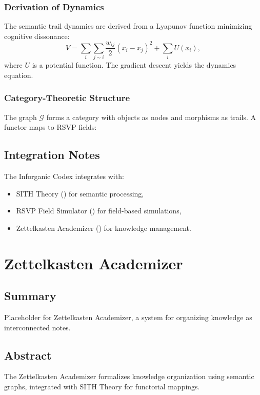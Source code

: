 \documentclass[11pt,oneside]{memoir}
\theoremstyle{plain}
\newcommand{\F}{\mathcal{F}}
\begin{document}
\subsection{Derivation of Dynamics}
The semantic trail dynamics are derived from a Lyapunov function minimizing cognitive dissonance:
\begin{equation}
    V = \sum_i \sum_{j \sim i} \frac{w_{ij}}{2} (x_i - x_j)^2 + \sum_i U(x_i),
\end{equation}
where \(U\) is a potential function. The gradient descent yields the dynamics equation.

\subsection{Category-Theoretic Structure}
The graph \(\mathcal{G}\) forms a category with objects as nodes and morphisms as trails. A functor maps to RSVP fields:

\section{Integration Notes}
The Inforganic Codex integrates with:
\begin{itemize}
    \item SITH Theory () for semantic processing,
    \item RSVP Field Simulator () for field-based simulations,
    \item Zettelkasten Academizer () for knowledge management.
\end{itemize}

\chapter{Zettelkasten Academizer}
\label{sec:zettelkasten}
\section{Summary}
Placeholder for Zettelkasten Academizer, a system for organizing knowledge as interconnected notes.

\section{Abstract}
The Zettelkasten Academizer formalizes knowledge organization using semantic graphs, integrated with SITH Theory for functorial mappings.
\end{document}
